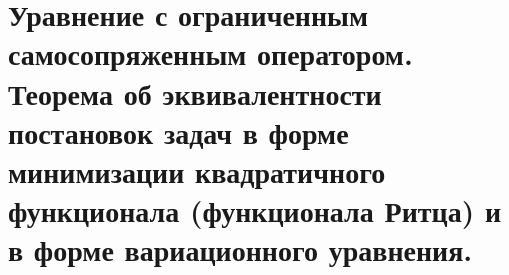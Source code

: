 \documentclass[__main__.tex]{subfiles}
\begin{document}
\section{Уравнение с ограниченным самосопряженным оператором. Теорема об эквивалентности постановок задач в форме минимизации квадратичного функционала (функционала Ритца) и в форме вариационного уравнения.}
\end{document}

